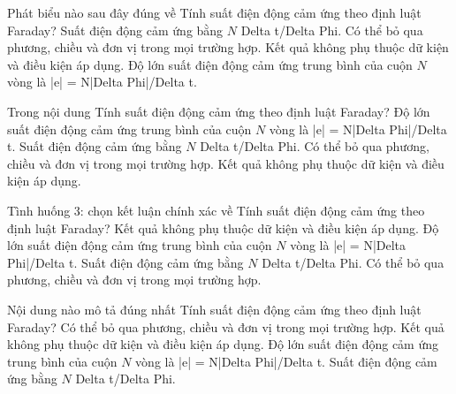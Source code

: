 \begin{ex}
Phát biểu nào sau đây đúng về Tính suất điện động cảm ứng theo định luật Faraday?
\choice
{Suất điện động cảm ứng bằng $N$ Delta t/Delta Phi.}
{Có thể bỏ qua phương, chiều và đơn vị trong mọi trường hợp.}
{Kết quả không phụ thuộc dữ kiện và điều kiện áp dụng.}
{\True Độ lớn suất điện động cảm ứng trung bình của cuộn $N$ vòng là |e| = N|Delta Phi|/Delta t.}
\end{ex}

\begin{ex}
Trong nội dung Tính suất điện động cảm ứng theo định luật Faraday?
\choice
{\True Độ lớn suất điện động cảm ứng trung bình của cuộn $N$ vòng là |e| = N|Delta Phi|/Delta t.}
{Suất điện động cảm ứng bằng $N$ Delta t/Delta Phi.}
{Có thể bỏ qua phương, chiều và đơn vị trong mọi trường hợp.}
{Kết quả không phụ thuộc dữ kiện và điều kiện áp dụng.}
\end{ex}

\begin{ex}
Tình huống 3: chọn kết luận chính xác về Tính suất điện động cảm ứng theo định luật Faraday?
\choice
{Kết quả không phụ thuộc dữ kiện và điều kiện áp dụng.}
{\True Độ lớn suất điện động cảm ứng trung bình của cuộn $N$ vòng là |e| = N|Delta Phi|/Delta t.}
{Suất điện động cảm ứng bằng $N$ Delta t/Delta Phi.}
{Có thể bỏ qua phương, chiều và đơn vị trong mọi trường hợp.}
\end{ex}

\begin{ex}
Nội dung nào mô tả đúng nhất Tính suất điện động cảm ứng theo định luật Faraday?
\choice
{Có thể bỏ qua phương, chiều và đơn vị trong mọi trường hợp.}
{Kết quả không phụ thuộc dữ kiện và điều kiện áp dụng.}
{\True Độ lớn suất điện động cảm ứng trung bình của cuộn $N$ vòng là |e| = N|Delta Phi|/Delta t.}
{Suất điện động cảm ứng bằng $N$ Delta t/Delta Phi.}
\end{ex}

